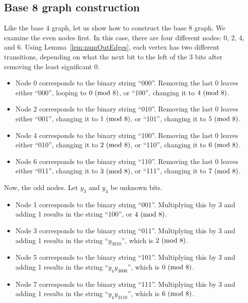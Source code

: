 \subsection{Base 8 graph construction} \label{subsubsec:base8proof}
Like the base 4 graph, let us show how to construct the base 8 graph. We examine the even nodes first. In this case, there are four different nodes: 0, 2, 4, and 6. Using Lemma~\ref{lem:numOutEdges}, each vertex has two different transitions, depending on what the next bit to the left of the 3 bits after removing the least significant 0. 
\begin{itemize}
    \item Node 0 corresponds to the binary string ``000''. Removing the last 0 leaves either ``000'', looping to $0\ (\mathrm{mod}\ 8)$, or ``100'', changing it to $4\ (\mathrm{mod}\ 8)$.
    \item Node 2 corresponds to the binary string ``010''. Removing the last 0 leaves either ``001'', changing it to $1\ (\mathrm{mod}\ 8)$, or ``101'', changing it to $5\ (\mathrm{mod}\ 8)$.
    \item Node 4 corresponds to the binary string ``100''. Removing the last 0 leaves either ``010'', changing it to $2\ (\mathrm{mod}\ 8)$, or ``110'', changing it to $6\ (\mathrm{mod}\ 8)$.
    \item Node 6 corresponds to the binary string ``110''. Removing the last 0 leaves either ``011'', changing it to $3\ (\mathrm{mod}\ 8)$, or ``111'', changing it to $7\ (\mathrm{mod}\ 8)$.
\end{itemize}
Now, the odd nodes. Let $y_3$ and $y_4$ be unknown bits.
\begin{itemize}
    \item Node 1 corresponds to the binary string ``001''. Multiplying this by 3 and adding 1 results in the string ``100'', or $4\ (\mathrm{mod}\ 8)$.
    \item Node 3 corresponds to the binary string ``011''. Multiplying this by 3 and adding 1 results in the string ``$y_3010$'', which is $2\ (\mathrm{mod}\ 8)$.
    \item Node 5 corresponds to the binary string ``101''. Multiplying this by 3 and adding 1 results in the string ``$y_4y_3000$'', which is $0\ (\mathrm{mod}\ 8)$.
    \item Node 7 corresponds to the binary string ``111''. Multiplying this by 3 and adding 1 results in the string ``$y_4y_3110$'', which is $6\ (\mathrm{mod}\ 8)$.
\end{itemize}
